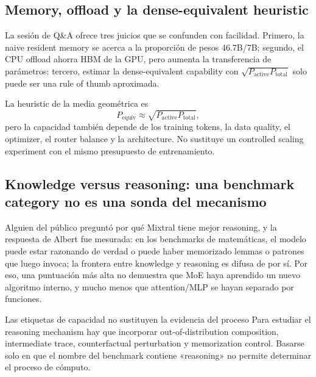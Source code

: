
\subsection{Memory, offload y la dense-equivalent heuristic}

La sesión de Q\&A ofrece tres juicios que se confunden con facilidad. Primero, la naive resident memory se acerca a la proporción de pesos 46.7B/7B; segundo, el CPU offload ahorra HBM de la GPU, pero aumenta la transferencia de parámetros; tercero, estimar la dense-equivalent capability con $\sqrt{P_{\text{active}}P_{\text{total}}}$ solo puede ser una rule of thumb aproximada.

La heuristic de la media geométrica es
\[
P_{\text{equiv}}\approx \sqrt{P_{\text{active}}P_{\text{total}}},
\]
pero la capacidad también depende de los training tokens, la data quality, el optimizer, el router balance y la architecture. No sustituye un controlled scaling experiment con el mismo presupuesto de entrenamiento.


\subsection{Knowledge versus reasoning: una benchmark category no es una sonda del mecanismo}

Alguien del público preguntó por qué Mixtral tiene mejor reasoning, y la respuesta de Albert fue mesurada: en los benchmarks de matemáticas, el modelo puede estar razonando de verdad o puede haber memorizado lemmas o patrones que luego invoca; la frontera entre knowledge y reasoning es difusa de por sí. Por eso, una puntuación más alta no demuestra que MoE haya aprendido un nuevo algoritmo interno, y mucho menos que attention/MLP se hayan separado por funciones.

\begin{warningbox}{Las etiquetas de capacidad no sustituyen la evidencia del proceso}
Para estudiar el reasoning mechanism hay que incorporar out-of-distribution composition, intermediate trace, counterfactual perturbation y memorization control. Basarse solo en que el nombre del benchmark contiene «reasoning» no permite determinar el proceso de cómputo.
\end{warningbox}

